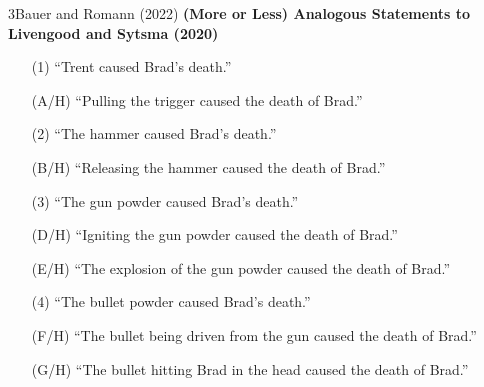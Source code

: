 \documentclass[xcolor=table,9pt,aspectratio=169]{beamer}
\begin{document}
\begin{frame}{\vspace*{10mm}3\hspace*{1em}Bauer and Romann (2022)}
\vspace*{-5mm}
\textbf{(More or Less) Analogous Statements to Livengood and Sytsma (2020)}\\
\begin{itemize}
   \item[(1)] ``Trent caused Brad's death.''
   \item[(A/H)] ``Pulling the trigger caused the death of Brad.''
\end{itemize}
\vspace*{0.5em}
\begin{itemize}
   \item[(2)] ``The hammer caused Brad's death.''
   \item[(B/H)] ``Releasing the hammer caused the death of Brad.''
\end{itemize}
\vspace*{0.5em}
\begin{itemize}
   \item[(3)] ``The gun powder caused Brad's death.''
   \item[(D/H)] ``Igniting the gun powder caused the death of Brad.''
   \item[(E/H)] ``The explosion of the gun powder caused the death of Brad.''
\end{itemize}
\vspace*{0.5em}
\begin{itemize}
   \item[(4)] ``The bullet powder caused Brad's death.''
   \item[(F/H)] ``The bullet being driven from the gun caused the death of Brad.''
   \item[(G/H)] ``The bullet hitting Brad in the head caused the death of Brad.''
\end{itemize}
\end{frame}
\end{document}
